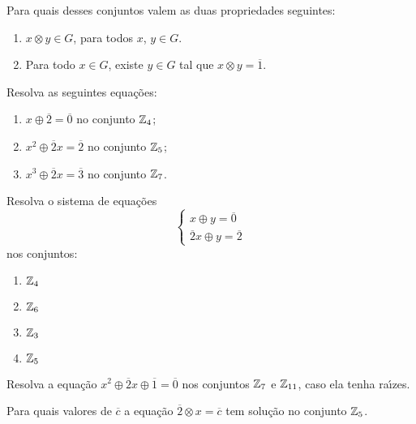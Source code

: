 \documentclass[12pt]{exam}
\begin{document}
Para quais desses conjuntos valem as duas propriedades seguintes:
\begin{enumerate}[label=({\roman*})]
    \item $x \otimes y \in G$, para todos $x$, $y \in G$.
    \item Para todo $x \in G$, existe $y \in G$ tal que $x \otimes y = \overline{1}$.
\end{enumerate}

\vspace{.3cm}

\questao{} Resolva as seguintes equa\c{c}\~oes:
\begin{enumerate}[label={\alph*})]
    \item $x \oplus \overline{2} = \overline{0}$ no conjunto $\mathbb{Z}_4$;
    \item $x^2 \oplus \overline{2}x = \overline{2}$ no conjunto $\mathbb{Z}_5$;
    \item $x^3 \oplus \overline{2}x = \overline{3}$ no conjunto $\mathbb{Z}_7$.
\end{enumerate}

\newpage

\questao{} Resolva o sistema de equa\c{c}\~oes
  \[
    \begin{cases}
      x \oplus y = \overline{0}\\
      \overline{2}x \oplus y = \overline{2}
    \end{cases}
  \]
nos conjuntos:
\begin{multicols}{2}
    \begin{enumerate}[label=({\alph*})]
        \item $\mathbb{Z}_4$
        \item $\mathbb{Z}_6$
        \item $\mathbb{Z}_3$
        \item $\mathbb{Z}_5$
    \end{enumerate}
\end{multicols}

\vspace{.3cm}

\questao{} Resolva a equa\c{c}\~ao $x^2 \oplus \overline{2}x \oplus \overline{1} = \overline{0}$ nos conjuntos $\mathbb{Z}_7$ e $\mathbb{Z}_{11}$, caso ela tenha ra{\'\i}zes.

\vspace{.3cm}

\questao{} Para quais valores de $\overline{c}$ a equa\c{c}\~ao $\overline{2}\otimes x = \overline{c}$ tem solu\c{c}\~ao no conjunto $\mathbb{Z}_5$.

\vspace{.3cm}
\end{document}
